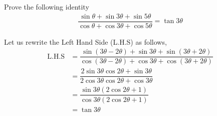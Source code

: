 
\question[3] Prove the following identity
\begin{align}
  \dfrac{\sin\theta + \sin 3\theta + \sin 5\theta}
  	{\cos \theta + \cos 3\theta + \cos 5\theta} = \tan 3\theta \nonumber
\end{align}

\begin{solution}[\halfpage]
  Let us rewrite the Left Hand Side (L.H.S) as follows,
  \begin{align}
    \text{L.H.S} &= \dfrac{\sin(3\theta - 2\theta ) + \sin 3\theta + 
    						\sin (3\theta + 2\theta)}
  						  {\cos (3\theta - 2\theta) + \cos 3\theta + 
  							\cos (3\theta + 2\theta)} \\
				 &= \dfrac{2\sin 3\theta \cos 2\theta + \sin 3\theta}
				  		  {2\cos 3\theta \cos 2\theta + \cos 3\theta} \\
				 &= \dfrac{\sin 3\theta(2\cos 2\theta + 1)}
				  		  {\cos 3\theta(2\cos 2\theta + 1)} \\
				 &= \tan 3\theta
  \end{align}
\end{solution}
